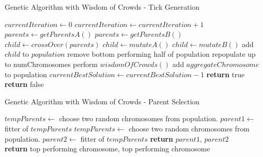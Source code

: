 \begin{algorithm}[H]
\caption{Genetic Algorithm with Wisdom of Crowds - Tick Generation}
	\begin{algorithmic}[1]
    		 
    			\State $currentIteration \gets 0$
    				\State $currentIteration \gets currentIteration + 1$
    					\State $parents \gets getParentsA()$
    				\Else
    					\State $parents \gets getParentsB()$
    				\EndIf
    				\State $child \gets crossOver(parents)$
    						\State $child \gets mutateA()$
    					\Else
    						\State $child \gets mutateB()$
    					\EndIf
    				\EndIf
    				\State add $child$ to $population$
    				\State remove bottom performing half of population
    				\State repopulate up to numChromosomes
    			\EndWhile
    				\State perform $wisdomOfCrowds()$ 
    				\State add $aggregateChromosome$ to population
    			\EndIf
    				\State $currentBestSolution \gets currentBestSolution -1$
    				\State \textbf{return} true
    			\Else
    				\State \textbf{return} false
    			\EndIf
   		\EndProcedure
    \end{algorithmic} 
\end{algorithm}

\begin{algorithm}[H]
\begin{algorithmic}[1]
\caption{Genetic Algorithm with Wisdom of Crowds - Parent Selection}
		\State $tempParents \gets$ choose two random chromosomes from population.
		\State $parent1 \gets$ fitter of $tempParents$
		\State $tempParents \gets$ choose two random chromosomes from population.
		\State $parent2 \gets$ fitter of $tempParents$
		\State \textbf{return} $parent1$, $parent2$
	\EndProcedure\\
	\setcounter{ALG@line}{0}
		\State \textbf{return} top performing chromosome, top performing chromosome
	\EndProcedure
\end{algorithmic}
\end{algorithm}

